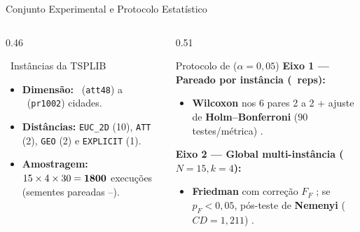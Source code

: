 \begin{frame}{Conjunto Experimental e Protocolo Estatístico}
  \begin{columns}[T,onlytextwidth]
    \begin{column}{0.46\textwidth}
      \begin{block}{\totalinstancias\ Instâncias da TSPLIB \autocite{reinelt1991tsplib}}
        \begin{itemize}
          \item \textbf{Dimensão:} \menorinstancia\ (\texttt{att48}) a \maiorinstancia\ (\texttt{pr1002}) cidades.
          \item \textbf{Distâncias:} \texttt{EUC\_2D} (10), \texttt{ATT} (2), \texttt{GEO} (2) e \texttt{EXPLICIT} (1).
          \item \textbf{Amostragem:} $15 \times 4 \times 30 = \mathbf{1800}$ execuções (sementes pareadas \sementeinicial--\sementefinal).
        \end{itemize}
      \end{block}
    \end{column}
    \begin{column}{0.51\textwidth}
      \begin{block}{Protocolo de \textcite{demsar2006statistical} ($\alpha = 0{,}05$)}
        \textbf{Eixo 1 — Pareado por instância (\totalrepeticoes\ reps):}
        \begin{itemize}
          \item \textbf{Wilcoxon} nos 6 pares 2 a 2 \autocite{wilcoxon1945individual} + ajuste de \textbf{Holm--Bonferroni} ($90$ testes/métrica) \autocite{holm1979simple}.
        \end{itemize}
        \vspace{0.1cm}
        \textbf{Eixo 2 — Global multi-instância ($N=15, k=4$):}
        \begin{itemize}
          \item \textbf{Friedman} com correção $F_F$ \autocite{friedman1937use}; se $p_F < 0{,}05$, pós-teste de \textbf{Nemenyi} ($CD = 1{,}211$) \autocite{nemenyi1963distribution}.
        \end{itemize}
      \end{block}
    \end{column}
  \end{columns}
\end{frame}

